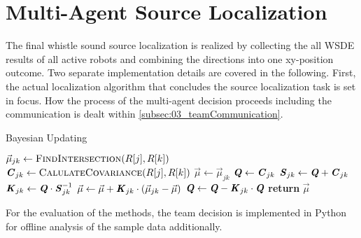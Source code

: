 \section{Multi-Agent Source Localization}
\label{sec:03_multiAgentLoca}

The final whistle sound source localization is realized by collecting the
all \ac{WSDE} results of all active robots and combining the directions
into one xy-position outcome.
Two separate implementation details are covered in the following.
First, the actual localization algorithm that concludes the source localization
task is set in focus.
How the process of the multi-agent decision proceeds including the communication
is dealt within \cref{subsec:03_teamCommunication}.


\begin{algorithm}[H]
    \caption{Bayesian Updating}\label{alg:03_multiAgentLoca}
    \begin{algorithmic}[1]
                    \State $\vec{\mu}_{jk} \gets \Call{FindIntersection}{R[j], R[k]}$
                    \State $\textbf{\textit{C}}_{jk} \gets \Call{CalulateCovariance}{R[j], R[k]}$
                        \State $\vec{\mu} \gets \vec{\mu}_{jk}$
                        \State $\textbf{\textit{Q}} \gets \textbf{\textit{C}}_{jk}$
                        \State $\textbf{\textit{S}}_{jk} \gets \textbf{\textit{Q}} + \textbf{\textit{C}}_{jk}$
                        \State $\textbf{\textit{K}}_{jk} \gets \textbf{\textit{Q}} \cdot \textbf{\textit{S}}_{jk}^{-1}$
                        \State $\vec{\mu} \gets \vec{\mu} + \textbf{\textit{K}}_{jk} \cdot (\vec{\mu}_{jk} - \vec{\mu})$
                        \State $\textbf{\textit{Q}} \gets \textbf{\textit{Q}} - \textbf{\textit{K}}_{jk} \cdot \textbf{\textit{Q}}$
                    \EndIf
                \EndFor
            \EndFor
            \State \textbf{return} $\vec{\mu}$
        \EndProcedure\vspace{12pt}
    \end{algorithmic}
\end{algorithm}


For the evaluation of the methods, the team decision is implemented in
Python for offline analysis of the sample data additionally.

